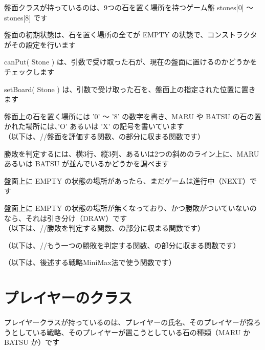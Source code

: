 \documentclass[uplatex,a4paper,11pt,oneside,openany]{jsbook}
\begin{document}
盤面クラスが持っているのは、9つの石を置く場所を持つゲーム盤 stones[0] 〜 stones[8] です

盤面の初期状態は、石を置く場所の全てが EMPTY の状態で、コンストラクタがその設定を行います

canPut( Stone ) は、引数で受け取った石が、現在の盤面に置けるのかどうかをチェックします

setBoard( Stone ) は、引数で受け取った石を、盤面上の指定された位置に置きます



盤面上の石を置く場所には '0' 〜 '8' の数字を書き、MARU や BATSU の石の置かれた場所には、'O' あるいは 'X' の記号を書いています\\

（以下は、//盤面を評価する関数、の部分に収まる関数です）



勝敗を判定するには、横3行、縦3列、あるいは2つの斜めのライン上に、MARU あるいは BATSU が並んでいるかどうかを調べます

盤面上に EMPTY の状態の場所があったら、まだゲームは進行中（NEXT）です

盤面上に EMPTY の状態の場所が無くなっており、かつ勝敗がついていないのなら、それは引き分け（DRAW）です\\

（以下は、//勝敗を判定する関数、の部分に収まる関数です）



（以下は、//もう一つの勝敗を判定する関数、の部分に収まる関数です）



（以下は、後述する戦略MiniMax法で使う関数です）



\section{プレイヤーのクラス}

プレイヤークラスが持っているのは、プレイヤーの氏名、そのプレイヤーが採ろうとしている戦略、そのプレイヤーが置こうとしている石の種類（MARU か BATSU か）です
\end{document}
